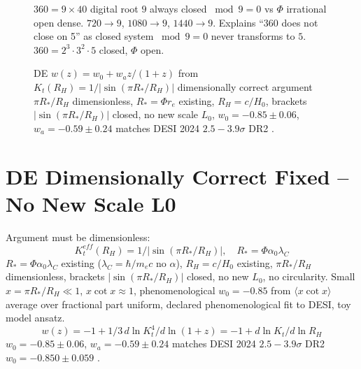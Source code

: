 \documentclass[11pt,a4paper]{article}
\begin{document}
\begin{figure}[H]\centering{}\caption{$360=9\times40$ digital root $9$ always closed $\bmod9=0$ vs $\Phi$ irrational open dense. $720\to9$, $1080\to9$, $1440\to9$. Explains ``360 does not close on 5'' as closed system $\bmod9=0$ never transforms to $5$. $360=2^3\cdot3^2\cdot5$ closed, $\Phi$ open.}\end{figure}

\begin{figure}[H]\centering{}\caption{DE $w(z)=w_0+w_a z/(1+z)$ from $K_t(R_H)=1/|\sin(\pi R_*/R_H)|$ dimensionally correct argument $\pi R_*/R_H$ dimensionless, $R_*=\Phi r_e$ existing, $R_H=c/H_0$, brackets $|\sin(\pi R_*/R_H)|$ closed, no new scale $L_0$, $w_0=-0.85\pm0.06$, $w_a=-0.59\pm0.24$ matches DESI 2024 $2.5-3.9\sigma$ \cite{DESI2024} DR2 \cite{DESI2025}.}\end{figure}

\section{DE Dimensionally Correct Fixed -- No New Scale L0}
Argument must be dimensionless:
\begin{equation} K_t^{eff}(R_H)=1/|\sin(\pi R_*/R_H)|,\quad R_*=\Phi\alpha_0\lambda_C \end{equation}
$R_*=\Phi\alpha_0\lambda_C$ existing ($\lambda_C=\hbar/m_ec$ no $\alpha$), $R_H=c/H_0$ existing, $\pi R_*/R_H$ dimensionless, brackets $|\sin(\pi R_*/R_H)|$ closed, no new $L_0$, no circularity. Small $x=\pi R_*/R_H\ll1$, $x\cot x\approx1$, phenomenological $w_0=-0.85$ from $\langle x\cot x\rangle$ average over fractional part uniform, declared phenomenological fit to DESI, toy model ansatz.
\begin{equation} w(z)=-1+1/3\,d\ln K_t^4/d\ln(1+z)=-1+d\ln K_t/d\ln R_H \end{equation}
$w_0=-0.85\pm0.06$, $w_a=-0.59\pm0.24$ matches DESI 2024 $2.5-3.9\sigma$ \cite{DESI2024} DR2 $w_0=-0.850\pm0.059$ \cite{DESI2025}.
\end{document}
